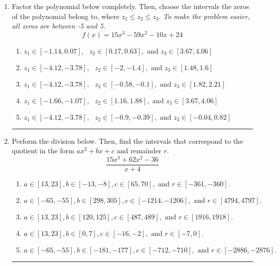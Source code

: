\documentclass[14pt]{extbook}
\newcommand{\litem}[1]{\item#1\hspace*{-1cm}\rule{\textwidth}{0.4pt}}
\begin{document}
\begin{enumerate}
{\begin{enumerate}[label=\Alph*.]
\end{enumerate} }
\litem{
Factor the polynomial below completely. Then, choose the intervals the zeros of the polynomial belong to, where $z_1 \leq z_2 \leq z_3$. \textit{To make the problem easier, all zeros are between -5 and 5.}\[ f(x) = 15x^{3} -59 x^{2} -10 x + 24 \]\begin{enumerate}[label=\Alph*.]
\item \( z_1 \in [-1.14, 0.07], \text{   }  z_2 \in [0.17, 0.63], \text{   and   } z_3 \in [3.67, 4.06] \)
\item \( z_1 \in [-4.12, -3.78], \text{   }  z_2 \in [-2, -1.4], \text{   and   } z_3 \in [1.48, 1.6] \)
\item \( z_1 \in [-4.12, -3.78], \text{   }  z_2 \in [-0.58, -0.1], \text{   and   } z_3 \in [1.82, 2.21] \)
\item \( z_1 \in [-1.66, -1.07], \text{   }  z_2 \in [1.16, 1.88], \text{   and   } z_3 \in [3.67, 4.06] \)
\item \( z_1 \in [-4.12, -3.78], \text{   }  z_2 \in [-0.9, -0.39], \text{   and   } z_3 \in [-0.04, 0.82] \)

\end{enumerate} }
\litem{
Perform the division below. Then, find the intervals that correspond to the quotient in the form $ax^2+bx+c$ and remainder $r$.\[ \frac{15x^{3} +62 x^{2} -36}{x + 4} \]\begin{enumerate}[label=\Alph*.]
\item \( a \in [13, 23], b \in [-13, -8], c \in [65, 70], \text{ and } r \in [-361, -360]. \)
\item \( a \in [-65, -55], b \in [298, 305], c \in [-1214, -1206], \text{ and } r \in [4794, 4797]. \)
\item \( a \in [13, 23], b \in [120, 125], c \in [487, 489], \text{ and } r \in [1916, 1918]. \)
\item \( a \in [13, 23], b \in [0, 7], c \in [-16, -2], \text{ and } r \in [-7, 0]. \)
\item \( a \in [-65, -55], b \in [-181, -177], c \in [-712, -710], \text{ and } r \in [-2886, -2876]. \)


\end{enumerate}}
\end{enumerate}
\end{document}
